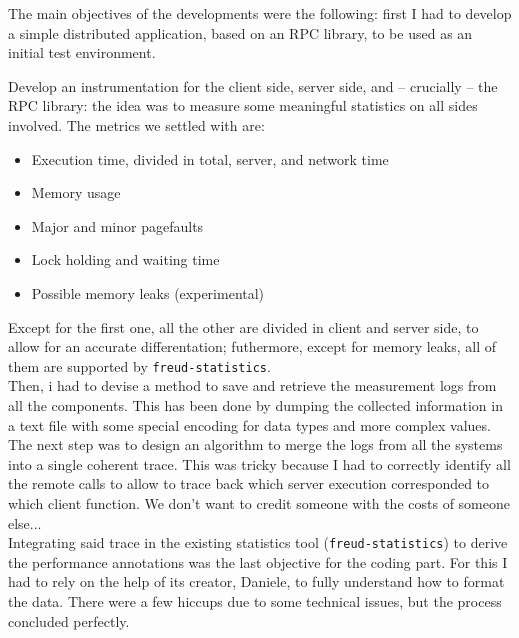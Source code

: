         The main objectives of the developments were the following: first I had to develop a
        simple distributed application, based on an RPC library, to be used as an initial test environment.

        Develop an instrumentation for the client side, server side, and – crucially – the RPC library:
        the idea was to measure some meaningful statistics on all sides involved. The metrics we settled with are:

        \begin{itemize}
            \item Execution time, divided in total, server, and network time
            \item Memory usage
            \item Major and minor pagefaults
            \item Lock holding and waiting time
            \item Possible memory leaks (experimental)
        \end{itemize}

        Except for the first one, all the other are divided in client and server side, to allow for an
        accurate differentation; futhermore, except for memory leaks, all of them are supported by 
        \texttt{freud-statistics}.\\

        Then, i had to devise a method to save and retrieve the measurement logs from all the components.
        This has been done by dumping the collected information in a text file with some special encoding
        for data types and more complex values.\\

        The next step was to design an algorithm to merge the logs from all the systems into a single
        coherent trace. This was tricky because I had to correctly identify all the remote calls to allow
        to trace back which server execution corresponded to which client function. We don't want to credit
        someone with the costs of someone else...\\

        Integrating said trace in the existing statistics tool (\texttt{freud-statistics}) to derive
        the performance annotations was the last objective for the coding part. For this I had to rely on the
        help of its creator, Daniele, to fully understand how to format the data. There were a few hiccups due to
        some technical issues, but the process concluded perfectly.

